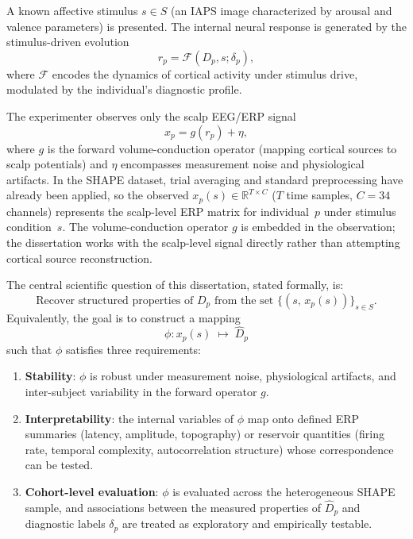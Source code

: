 A known affective stimulus $s \in S$ (an IAPS image characterized by arousal and valence parameters) is presented. The internal neural response is generated by the stimulus-driven evolution
\begin{equation}
    r_p = \mathcal{F}(D_p, s; \delta_p),
    \label{eq:forward_dynamics}
\end{equation}
where $\mathcal{F}$ encodes the dynamics of cortical activity under stimulus drive, modulated by the individual's diagnostic profile.

The experimenter observes only the scalp EEG/ERP signal
\begin{equation}
    x_p = g(r_p) + \eta,
    \label{eq:observation}
\end{equation}
where $g$ is the forward volume-conduction operator (mapping cortical sources to scalp potentials) and $\eta$ encompasses measurement noise and physiological artifacts. In the SHAPE dataset, trial averaging and standard preprocessing have already been applied, so the observed $x_p(s) \in \mathbb{R}^{T \times C}$ ($T$ time samples, $C = 34$ channels) represents the scalp-level ERP matrix for individual~$p$ under stimulus condition~$s$. The volume-conduction operator $g$ is embedded in the observation; the dissertation works with the scalp-level signal directly rather than attempting cortical source reconstruction.

The central scientific question of this dissertation, stated formally, is:
\begin{equation}
    \text{Recover structured properties of } D_p \text{ from the set } \{(s,\, x_p(s))\}_{s \in S}.
    \label{eq:inverse_problem}
\end{equation}
Equivalently, the goal is to construct a mapping
\begin{equation}
    \phi: x_p(s) \;\mapsto\; \hat{D}_p
    \label{eq:phi}
\end{equation}
such that $\phi$ satisfies three requirements:
\begin{enumerate}
    \item \textbf{Stability}: $\phi$ is robust under measurement noise, physiological artifacts, and inter-subject variability in the forward operator $g$.
    \item \textbf{Interpretability}: the internal variables of $\phi$ map onto defined ERP summaries (latency, amplitude, topography) or reservoir quantities (firing rate, temporal complexity, autocorrelation structure) whose correspondence can be tested.
    \item \textbf{Cohort-level evaluation}: $\phi$ is evaluated across the heterogeneous SHAPE sample, and associations between the measured properties of $\hat{D}_p$ and diagnostic labels $\delta_p$ are treated as exploratory and empirically testable.
\end{enumerate}

